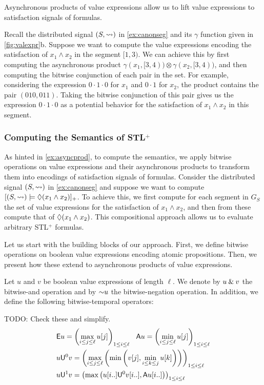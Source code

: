 Asynchronous products of value expressions allow us to lift value expressions to satisfaction signals of formulas.

\begin{example} \label{ex:asyncprod}
	Recall the distributed signal $(S, {\rightsquigarrow})$ in \cref{ex:canonseg} and its $\gamma$ function given in \cref{fig:valexpr}b.
	Suppose we want to compute the value expressions encoding the satisfaction of $x_1 \land x_2$ in the segment $[1,3)$.
	We can achieve this by first computing the asynchronous product $\gamma(x_1, [3,4)) \otimes \gamma(x_2, [3,4))$, and then computing the bitwise conjunction of each pair in the set.
	For example, considering the expression $0 \cdot 1 \cdot 0$ for $x_1$ and $0 \cdot 1$ for $x_2$, the product contains the pair $(010, 011)$.
	Taking the bitwise conjunction of this pair gives us the expression $0 \cdot 1 \cdot 0$ as a potential behavior for the satisfaction of $x_1 \land x_2$ in this segment.
\end{example}

\subsubsection{Computing the Semantics of STL$^+$}
As hinted in \cref{ex:asyncprod}, to compute the semantics, we apply bitwise operations on value expressions and their asynchronous products to transform them into encodings of satisfaction signals of formulas.
Consider the distributed signal $(S, {\rightsquigarrow})$ in \cref{ex:canonseg} and suppose we want to compute $[(S, {\rightsquigarrow}) \models \lozenge (x_1 \land x_2)]_+$.
To achieve this, we first compute for each segment in $G_S$ the set of value expressions for the satisfaction of $x_1 \land x_2$, and then from these compute that of $\lozenge (x_1 \land x_2)$.
This compositional approach allows us to evaluate arbitrary STL$^+$ formulas.

Let us start with the building blocks of our approach.
First, we define bitwise operations on boolean value expressions encoding atomic propositions.
Then, we present how these extend to asynchronous products of value expressions.

Let $u$ and $v$ be boolean value expressions of length $\ell$.
We denote by $u \mathbin{\&} v$ the bitwise-and operation and by $\mathord{\sim} u$ the bitwise-negation operation.
In addition, we define the following bitwise-temporal operators:

\alert{TODO: Check these and simplify.}
\small
\begin{align*}
	&\mathsf{E} u = \left( \max_{i \leq j \leq \ell} u[j] \right)_{1 \leq i \leq \ell} \hspace*{0.7em} \mathsf{A} u = \left( \min_{i \leq j \leq \ell} u[j] \right)_{1 \leq i \leq \ell}\\
	&u \mathsf{U}^0 v = \left( \max_{i \leq j \leq \ell} \left( \min \left( v[j], \min_{i \leq k \leq j} u[k] \right) \right) \right)_{1 \leq i \leq \ell} \\
	&u \mathsf{U}^1 v = \left( \max \left( u[i..] \mathsf{U}^0 v[i..], \mathsf{A} u[i..] \right) \right)_{1 \leq i \leq \ell} \\
\end{align*}
\normalsize


